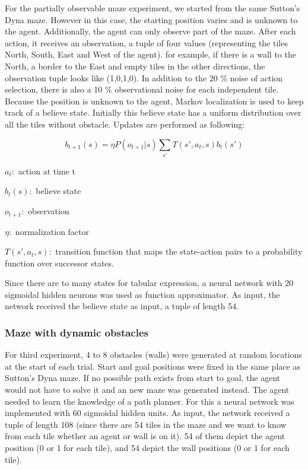 For the partially observable maze experiment, we started from the same
Sutton's Dyna maze. However in this case, the starting position varies
and is unknown to the agent. Additionally, the agent can only observe
part of the maze. After each action, it receives an observation, a tuple
of four values (representing the tiles North, South, East and West of
the agent). for example, if there is a wall to the North, a border to
the East and empty tiles in the other directions, the observation tuple
looks like (1,0,1,0). In addition to the 20 \% noise of action
selection, there is also a 10 \% observational noise for each
independent tile. Because the position is unknown to the agent, Markov
localization is used to keep track of a believe state. Initially this
believe state has a uniform distribution over all the tiles without
obstacle. Updates are performed as following:

\[ b_{t+1}(s) = \eta P(o_{t+1}|s) \sum_{s'}T(s',a_t,s) b_t(s') \]

\(a_t:\) action at time t

\(b_t(s):\) believe state

\(o_{t+1}:\) observation

\(\eta:\) normalization factor

\(T(s',a_t,s):\) transition function that maps the state-action pairs to
a probability function over successor states.

Since there are to many states for tabular expression, a neural network
with 20 sigmoidal hidden neurons was used as function approximator. As
input, the network received the believe state as input, a tuple of
length 54.

\hypertarget{maze-with-dynamic-obstacles}{%
\subsubsection{Maze with dynamic
obstacles}\label{maze-with-dynamic-obstacles}}

For third experiment, 4 to 8 obstacles (walls) were generated at random
locations at the start of each trial. Start and goal positions were
fixed in the same place as Sutton's Dyna maze. If no possible path
exists from start to goal, the agent would not have to solve it and an
new maze was generated instead. The agent needed to learn the knowledge
of a path planner. For this a neural network was implemented with 60
sigmoidal hidden units. As input, the network received a tuple of length
108 (since there are 54 tiles in the maze and we want to know from each
tile whether an agent or wall is on it). 54 of them depict the agent
position (0 or 1 for each tile), and 54 depict the wall positions (0 or
1 for each tile).

